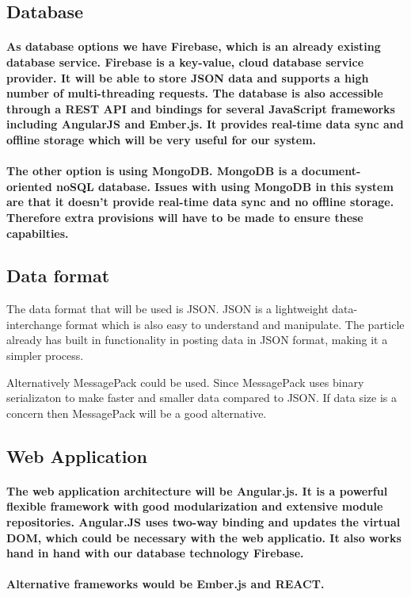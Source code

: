 \documentclass[paper=a4, fontsize=11pt]{scrartcl} %
\begin{document}
	\subsection{Database}
	\paragraph{As database options we have Firebase, which is an already existing database service. Firebase is a key-value, cloud database service provider. It will be
	able to store JSON data and supports a high number of multi-threading requests. The database is also accessible through a REST API and 
	bindings for several JavaScript frameworks including AngularJS and Ember.js. It provides real-time data sync and offline storage which will be
	very useful for our system.}
	\paragraph{The other option is using MongoDB. MongoDB is a document-oriented noSQL database. Issues with using MongoDB in this system are that it
	doesn't provide real-time data sync and no offline storage. Therefore extra provisions will have to be made to ensure these capabilties.}
	\subsection{Data format}
	The data format that will be used is JSON. JSON is a lightweight data-interchange format which is also easy to understand and
	manipulate. The particle already has built in functionality in posting data in JSON format, making it a simpler process.
	
	Alternatively MessagePack could be used. Since MessagePack uses binary serializaton to make faster and smaller data compared to JSON.
	If data size is a concern then MessagePack will be a good alternative.
	\subsection{Web Application}
	\paragraph{The web application architecture will be Angular.js. It is a powerful flexible framework with good modularization and extensive module
	repositories. Angular.JS uses two-way binding and updates the virtual DOM, which could be necessary with the web applicatio. It also works
	hand in hand with our database technology Firebase.}
	
	\paragraph{Alternative frameworks would be Ember.js and REACT.}
\end{document}
